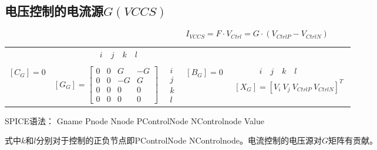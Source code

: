 \documentclass[12pt]{article}
\begin{document}
\subsection{电压控制的电流源$G(VCCS)$}
\begin{equation*}
  I_{VCCS}=F·V_{Ctrl}=G·\left(V_{CtrlP} - V_{CtrlN}\right)
\end{equation*}
\begin{table}[H]
  \centering\renewcommand{}
  \begin{tabular}{ccccc}
   & $ \qquad \quad i \quad j \quad k \quad l$ & & & \\                            \\
  $\left[C_{G}\right]=0$ & 
  $\left[G_{G}\right]=\left[\begin{array}{cccc} 0 & 0 & G & -G \\ 0 & 0 & -G & G \\ 0 & 0 & 0 & 0 \\ 0 & 0 & 0 & 0\end{array}\right]$  & 
  $\begin{array}{c} i \\ j \\ k \\ l\end{array}$ &
  $\left[B_{G}\right]=0$ & 
  $\begin{array}{c} \qquad \quad i \quad j \quad k \quad l\\ \left[X_{G}\right]=\left[ V_{i}\ V_{j}\ V_{CtrlP}\ V_{CtrlN}\right]^T \end{array}$ \\
  \end{tabular}
\end{table}
\qquad SPICE语法： Gname Pnode Nnode PControlNode NControlnode Value\par
\qquad 式中$k$和$l$分别对于控制的正负节点即PControlNode NControlnode。电流控制的电压源对$G$矩阵有贡献。\par
\end{document}
